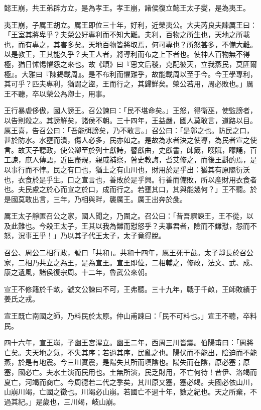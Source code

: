 \begin{pinyinscope}
懿王崩，共王弟辟方立，是為孝王。孝王崩，諸侯復立懿王太子燮，是為夷王。

夷王崩，子厲王胡立。厲王即位三十年，好利，近榮夷公。大夫芮良夫諫厲王曰：「王室其將卑乎？夫榮公好專利而不知大難。夫利，百物之所生也，天地之所載也，而有專之，其害多矣。天地百物皆將取焉，何可專也？所怒甚多，不備大難。以是教王，王其能久乎？夫王人者，將導利而布之上下者也。使神人百物無不得極，猶日怵惕懼怨之來也。故《頌》曰『思文后稷，克配彼天，立我蒸民，莫匪爾極』。大雅曰『陳錫載周』。是不布利而懼難乎，故能載周以至于今。今王學專利，其可乎？匹夫專利，猶謂之盜，王而行之，其歸鮮矣。榮公若用，周必敗也。」厲王不聽，卒以榮公為卿士，用事。

王行暴虐侈傲，國人謗王。召公諫曰：「民不堪命矣。」王怒，得衛巫，使監謗者，以告則殺之。其謗鮮矣，諸侯不朝。三十四年，王益嚴，國人莫敢言，道路以目。厲王喜，告召公曰：「吾能弭謗矣，乃不敢言。」召公曰：「是鄣之也。防民之口，甚於防水。水壅而潰，傷人必多，民亦如之。是故為水者決之使導，為民者宣之使言。故天子聽政，使公卿至於列士獻詩，瞽獻曲，史獻書，師箴，瞍賦，矇誦，百工諫，庶人傳語，近臣盡規，親戚補察，瞽史教誨，耆艾修之，而後王斟酌焉，是以事行而不悖。民之有口也，猶土之有山川也，財用於是乎出：猶其有原隰衍沃也，衣食於是乎生。口之宣言也，善敗於是乎興。行善而備敗，所以產財用衣食者也。夫民慮之於心而宣之於口，成而行之。若壅其口，其與能幾何？」王不聽。於是國莫敢出言，三年，乃相與畔，襲厲王。厲王出奔於彘。

厲王太子靜匿召公之家，國人聞之，乃圍之。召公曰：「昔吾驟諫王，王不從，以及此難也。今殺王太子，王其以我為讎而懟怒乎？夫事君者，險而不讎懟，怨而不怒，況事王乎！」乃以其子代王太子，太子竟得脫。

召公、周公二相行政，號曰「共和」。共和十四年，厲王死于彘。太子靜長於召公家，二相乃共立之為王，是為宣王。宣王即位，二相輔之，修政，法文、武、成、康之遺風，諸侯復宗周。十二年，魯武公來朝。

宣王不修籍於千畝，虢文公諫曰不可，王弗聽。三十九年，戰于千畝，王師敗績于姜氏之戎。

宣王既亡南國之師，乃料民於太原。仲山甫諫曰：「民不可料也。」宣王不聽，卒料民。

四十六年，宣王崩，子幽王宮湦立。幽王二年，西周三川皆震。伯陽甫曰：「周將亡矣。夫天地之氣，不失其序；若過其序，民亂之也。陽伏而不能出，陰迫而不能蒸，於是有地震。今三川實震，是陽失其所而填陰也。陽失而在陰，原必塞；原塞，國必亡。夫水土演而民用也。土無所演，民乏財用，不亡何待！昔伊、洛竭而夏亡，河竭而商亡。今周德若二代之季矣，其川原又塞，塞必竭。夫國必依山川，山崩川竭，亡國之徵也。川竭必山崩。若國亡不過十年，數之紀也。天之所棄，不過其紀。」是歲也，三川竭，岐山崩。


\end{pinyinscope}
